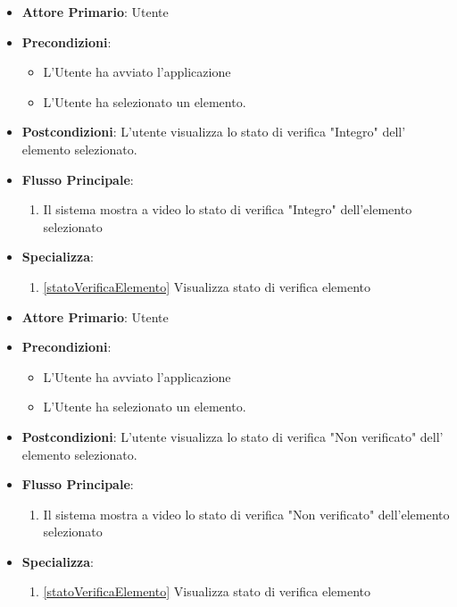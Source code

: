 \begin{itemize}
    \item \textbf{Attore Primario}: Utente
    \item \textbf{Precondizioni}: \begin{itemize}
        \item L'Utente ha avviato l'applicazione
        \item L'Utente ha selezionato un elemento.
    \end{itemize}
    \item \textbf{Postcondizioni}: L'utente visualizza lo stato di verifica "Integro" dell' elemento selezionato.
    \item \textbf{Flusso Principale}:
    \begin{enumerate}
              \item Il sistema mostra a video lo stato di verifica "Integro" dell'elemento selezionato
    \end{enumerate}
    \item \textbf{Specializza}:
    \begin{enumerate}
              \item \ref{statoVerificaElemento} Visualizza stato di verifica elemento
    \end{enumerate}
\end{itemize}

\begin{itemize}
    \item \textbf{Attore Primario}: Utente
    \item \textbf{Precondizioni}: \begin{itemize}
        \item L'Utente ha avviato l'applicazione
        \item L'Utente ha selezionato un elemento.
    \end{itemize}
    \item \textbf{Postcondizioni}: L'utente visualizza lo stato di verifica "Non verificato" dell' elemento selezionato.
    \item \textbf{Flusso Principale}:
    \begin{enumerate}
              \item Il sistema mostra a video lo stato di verifica "Non verificato" dell'elemento selezionato
    \end{enumerate}
    \item \textbf{Specializza}:
    \begin{enumerate}
              \item \ref{statoVerificaElemento} Visualizza stato di verifica elemento
    \end{enumerate}
\end{itemize}

